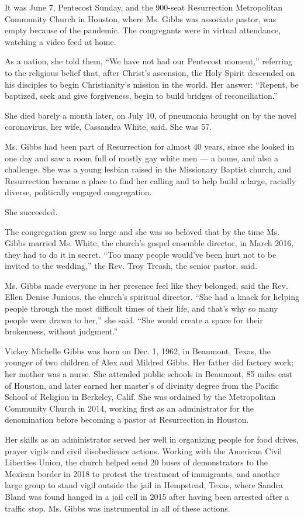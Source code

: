It was June 7, Pentecost Sunday, and the 900-seat Resurrection
Metropolitan Community Church in Houston, where Ms. Gibbs was associate
pastor, was empty because of the pandemic. The congregants were in
virtual attendance, watching a video feed at home.

As a nation, she told them, ``We have not had our Pentecost moment,''
referring to the religious belief that, after Christ's ascension, the
Holy Spirit descended on his disciples to begin Christianity's mission
in the world. Her answer: ``Repent, be baptized, seek and give
forgiveness, begin to build bridges of reconciliation.''

She died barely a month later, on July 10, of pneumonia brought on by
the novel coronavirus, her wife, Cassandra White, said. She was 57.

Ms. Gibbs had been part of Resurrection for almost 40 years, since she
looked in one day and saw a room full of mostly gay white men --- a
home, and also a challenge. She was a young lesbian raised in the
Missionary Baptist church, and Resurrection became a place to find her
calling and to help build a large, racially diverse, politically engaged
congregation.

She succeeded.

The congregation grew so large and she was so beloved that by the time
Ms. Gibbs married Ms. White, the church's gospel ensemble director, in
March 2016, they had to do it in secret. ``Too many people would've been
hurt not to be invited to the wedding,'' the Rev. Troy Treash, the
senior pastor, said.

Ms. Gibbs made everyone in her presence feel like they belonged, said
the Rev. Ellen Denise Junious, the church's spiritual director. ``She
had a knack for helping people through the most difficult times of their
life, and that's why so many people were drawn to her,'' she said. ``She
would create a space for their brokenness, without judgment.''

Vickey Michelle Gibbs was born on Dec. 1, 1962, in Beaumont, Texas, the
younger of two children of Alex and Mildred Gibbs. Her father did
factory work; her mother was a nurse. She attended public schools in
Beaumont, 85 miles east of Houston, and later earned her master's of
divinity degree from the Pacific School of Religion in Berkeley, Calif.
She was ordained by the Metropolitan Community Church in 2014, working
first as an administrator for the denomination before becoming a pastor
at Resurrection in Houston.

Her skills as an administrator served her well in organizing people for
food drives, prayer vigils and civil disobedience actions. Working with
the American Civil Liberties Union, the church helped send 20 buses of
demonstrators to the Mexican border in 2018 to protest the treatment of
immigrants, and another large group to stand vigil outside the jail in
Hempstead, Texas, where Sandra Bland was found hanged in a jail cell in
2015 after having been arrested after a traffic stop. Ms. Gibbs was
instrumental in all of these actions.

